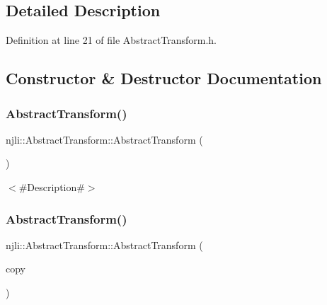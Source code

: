\subsection{Detailed Description}


Definition at line 21 of file Abstract\+Transform.\+h.



\subsection{Constructor \& Destructor Documentation}
\mbox{\label{classnjli_1_1_abstract_transform_ae81766ce7baa95743ad256dfab13a086}} 
\subsubsection{\texorpdfstring{Abstract\+Transform()}{AbstractTransform()}\hspace{0.1cm}{\footnotesize\ttfamily [1/2]}}
{\footnotesize\ttfamily njli\+::\+Abstract\+Transform\+::\+Abstract\+Transform (\begin{DoxyParamCaption}{ }\end{DoxyParamCaption})}

$<$\#\+Description\#$>$ \mbox{\label{classnjli_1_1_abstract_transform_a8ea40aa6d85fc58ddec0962568921ddc}} 
\subsubsection{\texorpdfstring{Abstract\+Transform()}{AbstractTransform()}\hspace{0.1cm}{\footnotesize\ttfamily [2/2]}}
{\footnotesize\ttfamily njli\+::\+Abstract\+Transform\+::\+Abstract\+Transform (\begin{DoxyParamCaption}\item[{const \mbox{\hyperlink{classnjli_1_1_abstract_transform}{Abstract\+Transform}} \&}]{copy }\end{DoxyParamCaption})}

